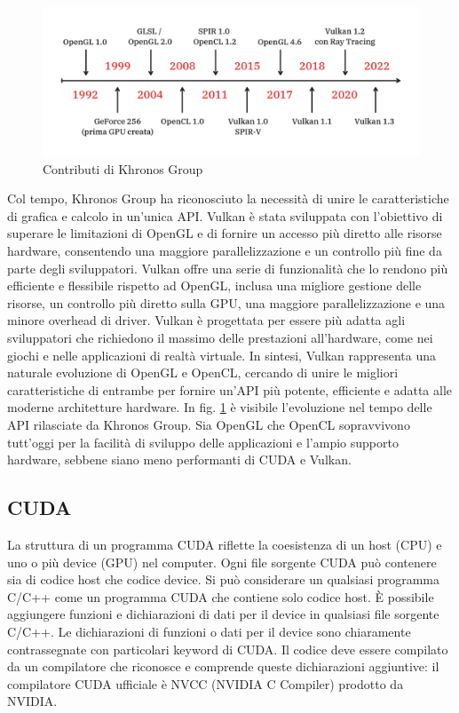 \begin{figure}[ht]
    \centering
    \includegraphics[width=.9\linewidth]{images/chapter2/vulkan_history.png}
    \caption{Contributi di Khronos Group}
    \label{fig:vulkan_history}
\end{figure}

Col tempo, Khronos Group ha riconosciuto la necessità di unire le caratteristiche di grafica e calcolo in un'unica API. Vulkan è stata sviluppata con l'obiettivo di superare le limitazioni di OpenGL e di fornire un accesso più diretto alle risorse hardware, consentendo una maggiore parallelizzazione e un controllo più fine da parte degli sviluppatori. Vulkan offre una serie di funzionalità che lo rendono più efficiente e flessibile rispetto ad OpenGL, inclusa una migliore gestione delle risorse, un controllo più diretto sulla GPU, una maggiore parallelizzazione e una minore overhead di driver. Vulkan è progettata per essere più adatta agli sviluppatori che richiedono il massimo delle prestazioni all'hardware, come nei giochi e nelle applicazioni di realtà virtuale. In sintesi, Vulkan rappresenta una naturale evoluzione di OpenGL e OpenCL, cercando di unire le migliori caratteristiche di entrambe per fornire un'API più potente, efficiente e adatta alle moderne architetture hardware. In fig. \ref{fig:vulkan_history} è visibile l'evoluzione nel tempo delle API rilasciate da Khronos Group. Sia OpenGL che OpenCL sopravvivono tutt'oggi per la facilità di sviluppo delle applicazioni e l'ampio supporto hardware, sebbene siano meno performanti di CUDA e Vulkan.

\subsection[CUDA]{CUDA}

La struttura di un programma CUDA riflette la coesistenza di un host (CPU) e uno o più device (GPU) nel computer. Ogni file sorgente CUDA può contenere sia di codice host che codice device. Si può considerare un qualsiasi programma C/C++ come un programma CUDA che contiene solo codice host. È possibile aggiungere funzioni e dichiarazioni di dati per il device in qualsiasi file sorgente C/C++. Le dichiarazioni di funzioni o dati per il device sono chiaramente contrassegnate con particolari keyword di CUDA. Il codice deve essere compilato da un compilatore che riconosce e comprende queste dichiarazioni aggiuntive: il compilatore CUDA ufficiale è NVCC (NVIDIA C Compiler) prodotto da NVIDIA.

